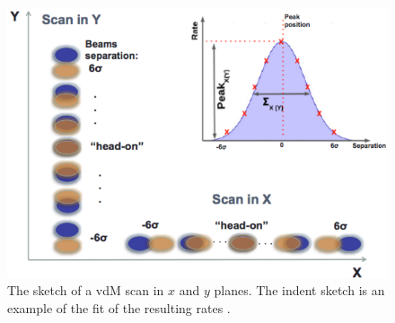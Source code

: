 \begin{center}
  \begin{figure}[h!]
    \centering
    \includegraphics[scale=.37]{Chapter3/vdm_sketch.png}
    \caption[Sketch of a vdM scan in x and y planes and example of fitting resulting rates]{ The sketch of a vdM scan in $x$ and $y$ planes. The indent sketch is an example of the fit of the resulting rates \cite{vdM_sketch}.}
    \label{vdm_sketch}
  \end{figure}
\end{center}

